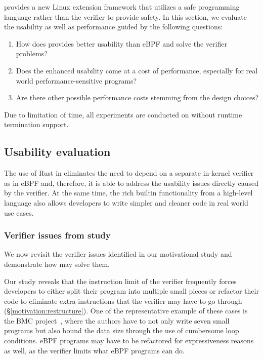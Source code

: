 \projname{} provides a new Linux extension framework that utilizes a safe
    programming language rather than the verifier to provide safety.
In this section, we evaluate the usability as well as performance guided by the
    following questions:
\begin{enumerate}
    \item How does \projname{} provides better usability than eBPF and solve the
        verifier problems?
    \item Does the enhanced usability come at a cost of performance, especially
        for real world performance-sensitive programs?
    \item Are there other possible performance costs stemming from the design
        choices?
\end{enumerate}

Due to limitation of time, all experiments are conducted on
    \projname{} without runtime termination support.

\subsection{Usability evaluation}
The use of Rust in \projname{} eliminates the need to depend on a separate
    in-kernel verifier as in eBPF and, therefore, it is able to address the
    usability issues directly caused by the verifier.
At the same time, the rich builtin functionality from a high-level language
    also allows developers to write simpler and cleaner code in real world use
    cases.

\subsubsection{Verifier issues from study}
We now revisit the verifier issues identified in our motivational study and
    demonstrate how \projname{} may solve them.

Our study reveals that the instruction limit of the verifier frequently
    forces developers to either split their program into multiple small pieces
    or refactor their code to eliminate extra instructions that the verifier
    may have to go through (\S\ref{motivation:restructure}).
One of the representative example of these cases is the BMC project~\cite{BMC},
    where the authors have to not only write seven small programs but also
    bound the data size through the use of cumbersome loop conditions.
eBPF programs may have to be refactored for expressiveness reasons as well,
    as the verifier limits what eBPF programs can do.

